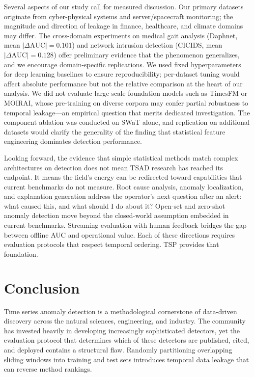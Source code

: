 \documentclass[preprint,12pt]{elsarticle}
\begin{document}
Several aspects of our study call for measured discussion. Our primary datasets originate from cyber-physical systems and server/spacecraft monitoring; the magnitude and direction of leakage in finance, healthcare, and climate domains may differ. The cross-domain experiments on medical gait analysis (Daphnet, mean $|\Delta\text{AUC}| = 0.101$) and network intrusion detection (CICIDS, mean $|\Delta\text{AUC}| = 0.128$) offer preliminary evidence that the phenomenon generalizes, and we encourage domain-specific replications. We used fixed hyperparameters for deep learning baselines to ensure reproducibility; per-dataset tuning would affect absolute performance but not the relative comparison at the heart of our analysis. We did not evaluate large-scale foundation models such as TimesFM or MOIRAI, whose pre-training on diverse corpora may confer partial robustness to temporal leakage---an empirical question that merits dedicated investigation. The component ablation was conducted on SWaT alone, and replication on additional datasets would clarify the generality of the finding that statistical feature engineering dominates detection performance.

Looking forward, the evidence that simple statistical methods match complex architectures on detection does not mean TSAD research has reached its endpoint. It means the field's energy can be redirected toward capabilities that current benchmarks do not measure. Root cause analysis, anomaly localization, and explanation generation \cite{han2025root,multiversead2025,axis2025} address the operator's next question after an alert: what caused this, and what should I do about it? Open-set and zero-shot anomaly detection \cite{dada2025,ibm_tspulse2026} move beyond the closed-world assumption embedded in current benchmarks. Streaming evaluation with human feedback \cite{openchallenges2025} bridges the gap between offline AUC and operational value. Each of these directions requires evaluation protocols that respect temporal ordering. TSP provides that foundation.

\section{Conclusion}

Time series anomaly detection is a methodological cornerstone of data-driven discovery across the natural sciences, engineering, and industry. The community has invested heavily in developing increasingly sophisticated detectors, yet the evaluation protocol that determines which of these detectors are published, cited, and deployed contains a structural flaw. Randomly partitioning overlapping sliding windows into training and test sets introduces temporal data leakage that can reverse method rankings.
\end{document}
